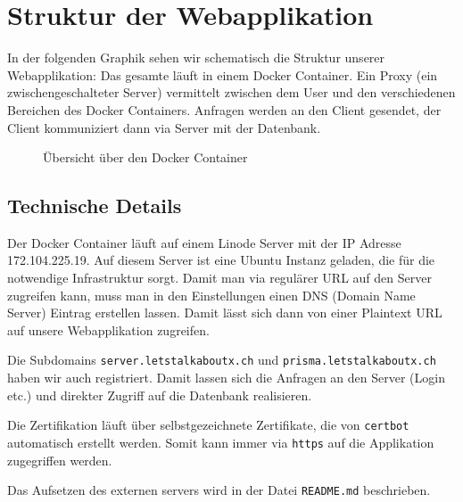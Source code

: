 \section{Struktur der Webapplikation}

In der folgenden Graphik sehen wir schematisch die Struktur unserer Webapplikation: Das gesamte läuft in einem Docker Container. Ein Proxy (ein zwischengeschalteter Server) vermittelt zwischen dem User und den verschiedenen Bereichen des Docker Containers. Anfragen werden an den Client gesendet, der Client kommuniziert dann via Server mit der Datenbank.
\begin{figure}[ht]
    \caption{Übersicht über den Docker Container \cite{fig:docker}}
\end{figure}

\subsection{Technische Details}

Der Docker Container läuft auf einem Linode Server mit der IP Adresse 172.104.225.19. Auf diesem Server ist eine Ubuntu Instanz geladen, die für die notwendige Infrastruktur sorgt. Damit man via regulärer URL auf den Server zugreifen kann, muss man in den Einstellungen einen DNS (Domain Name Server) Eintrag erstellen lassen. Damit lässt sich dann von einer Plaintext URL auf unsere Webapplikation zugreifen. 

Die Subdomains \verb|server.letstalkaboutx.ch| und \verb|prisma.letstalkaboutx.ch| haben wir auch registriert. Damit lassen sich die Anfragen an den Server (Login etc.) und direkter Zugriff auf die Datenbank realisieren.

Die Zertifikation läuft über selbstgezeichnete Zertifikate, die von \verb|certbot| automatisch erstellt werden. Somit kann immer via \verb|https| auf die Applikation zugegriffen werden.

Das Aufsetzen des externen servers wird in der Datei \verb|README.md| beschrieben.









